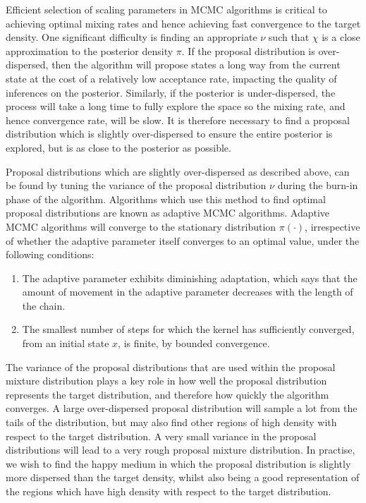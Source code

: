 \documentclass[final]{siamltex}
\begin{document}
Efficient selection of scaling parameters in MCMC algorithms is critical to achieving optimal mixing rates and hence achieving fast convergence to the target density. One significant difficulty is finding an appropriate $\nu$ such that
$\chi$ is a close approximation to the posterior density $\pi$. If the proposal distribution is over-dispersed, then the algorithm will propose states a long way from the current state at the cost of a relatively low acceptance rate, impacting the quality of inferences on the posterior. Similarly, if the posterior is under-dispersed, the process will take a long time to fully explore the space so the mixing rate, and hence convergence rate, will be slow. It is therefore necessary to find a proposal distribution which is slightly over-dispersed to ensure the entire posterior is explored\cite{gelman1992inference}, but is as close to the posterior as possible.

Proposal distributions which are slightly over-dispersed as described
above, can be found by tuning the variance of the proposal
distribution $\nu$ during the burn-in phase of the
algorithm. Algorithms which use this method to find optimal proposal
distributions are known as adaptive MCMC algorithms. Adaptive MCMC
algorithms will converge to the stationary distribution $\pi(\cdot)$,
irrespective of whether the adaptive parameter itself converges to an
optimal value, under the following
conditions\cite{roberts2007coupling,roberts2009examples}: 
\begin{enumerate}
\item The adaptive parameter exhibits diminishing adaptation, which says that the amount of movement in the adaptive parameter decreases with the length of the chain. 
\item The smallest number of steps for which the kernel has sufficiently converged, from an initial state $x$, is finite, by bounded convergence.
\end{enumerate}

The variance of the proposal distributions that are used within the
proposal mixture distribution plays a key role in how well the
proposal distribution represents the target distribution, and
therefore how quickly the algorithm converges. A large over-dispersed
proposal distribution will sample a lot from the tails of the
distribution, but may also find other regions of high density with
respect to the target distribution. A very small variance in the
proposal distributions will lead to a very rough proposal mixture
distribution. In practise, we wish to find the happy medium in which
the proposal distribution is slightly more dispersed than the target
density, whilst also being a good representation of the regions which
have high density with respect to the target distribution.
\end{document}
